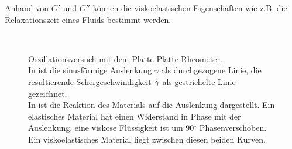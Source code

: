 Anhand von $G'$ und $G''$ können die viskoelastischen Eigenschaften wie z.B. die Relaxationszeit eines Fluids bestimmt werden.

\begin{figure}
    \centering
    \\
    \caption{Oszillationsversuch mit dem Platte-Platte Rheometer.\\
    In  ist die sinusförmige Auslenkung $\gamma$ als durchgezogene Linie, die resultierende Schergeschwindigkeit $\dot\gamma$ als gestrichelte Linie gezeichnet.\\
    In  ist die Reaktion des Materials auf die Auslenkung dargestellt. Ein elastisches Material hat einen Widerstand in Phase mit der Auslenkung, eine viskose Flüssigkeit ist um 90$^\circ$ Phasenverschoben. Ein viskoelastisches Material liegt zwischen diesen beiden Kurven.
    }
    \label{fig:schwingungsmodi}
\end{figure}
%
